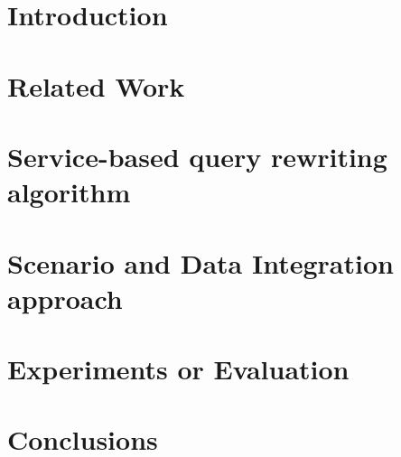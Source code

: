 \documentclass[preprint,12pt]{elsarticle}
\theoremstyle{plain}
\theoremstyle{plain}
\theoremstyle{plain}
\theoremstyle{plain}
\begin{document}
\section{Introduction}

\section{Related Work}

\section{Service-based query rewriting algorithm}




\section{Scenario and Data Integration approach}

\section{Experiments or Evaluation}

\section{Conclusions}
\end{document}
